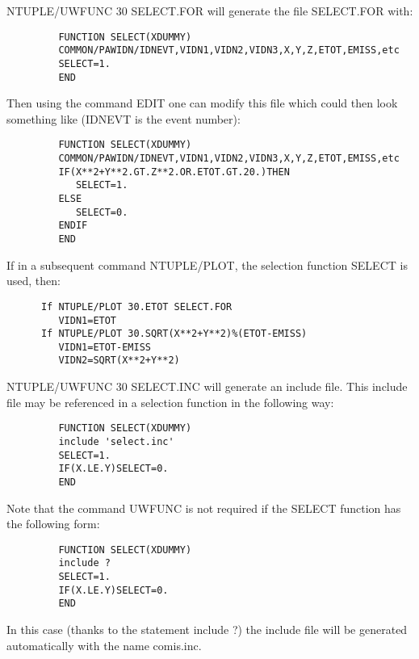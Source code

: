    \par
NTUPLE/UWFUNC 30 SELECT.FOR   will generate the file SELECT.FOR with:  
\begin{verbatim}
         FUNCTION SELECT(XDUMMY)
         COMMON/PAWIDN/IDNEVT,VIDN1,VIDN2,VIDN3,X,Y,Z,ETOT,EMISS,etc
         SELECT=1.
         END
\end{verbatim}
   \par
Then using the command EDIT one can modify this file which could then look 
   something like (IDNEVT is the event number):  
\begin{verbatim}
         FUNCTION SELECT(XDUMMY)
         COMMON/PAWIDN/IDNEVT,VIDN1,VIDN2,VIDN3,X,Y,Z,ETOT,EMISS,etc
         IF(X**2+Y**2.GT.Z**2.OR.ETOT.GT.20.)THEN
            SELECT=1.
         ELSE
            SELECT=0.
         ENDIF
         END
\end{verbatim}
   \par
If in a subsequent command NTUPLE/PLOT, the selection function SELECT is 
   used, then:  
\begin{verbatim}
      If NTUPLE/PLOT 30.ETOT SELECT.FOR
         VIDN1=ETOT
      If NTUPLE/PLOT 30.SQRT(X**2+Y**2)%(ETOT-EMISS)
         VIDN1=ETOT-EMISS
         VIDN2=SQRT(X**2+Y**2)
\end{verbatim}
\ENDVERB
   \par
NTUPLE/UWFUNC 30 SELECT.INC will generate an include file. This include 
   file may be referenced in a selection function in the following way:  
\begin{verbatim}
         FUNCTION SELECT(XDUMMY)
         include 'select.inc'
         SELECT=1.
         IF(X.LE.Y)SELECT=0.
         END
\end{verbatim}
\ENDVERB
   \par
Note that the command UWFUNC is not required if the SELECT function has the 
   following form:  
\begin{verbatim}
         FUNCTION SELECT(XDUMMY)
         include ?
         SELECT=1.
         IF(X.LE.Y)SELECT=0.
         END
\end{verbatim}
   \par
In this case (thanks to the statement \DQUOTE{}include ?\DQUOTE{}) the 
   include file will be generated automatically with the name 
   \DQUOTE{}comis.inc\DQUOTE{}.  

\ENDCMD


\BEGARG
{}
\ENDARG
{}
\ENDOPT

